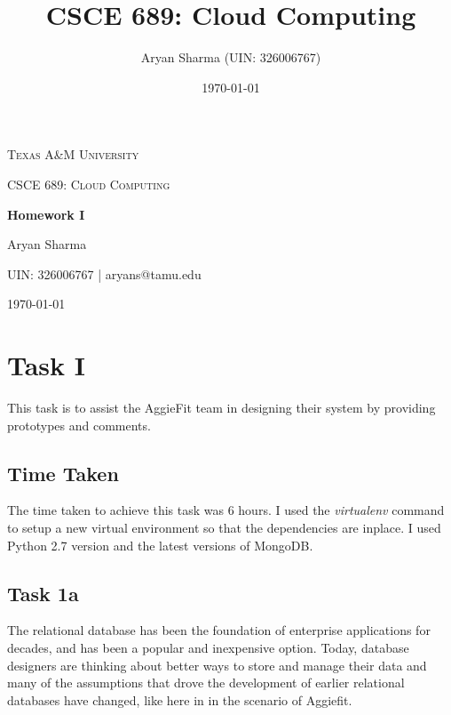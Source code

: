 \documentclass[letterpaper]{article}
\title{CSCE 689: Cloud Computing}
\author{Aryan Sharma (UIN: 326006767)}
\date{\today}
\newcommand\blankpage{%
	\null
	\thispagestyle{empty}%
	\addtocounter{page}{-1}%
	\newpage}
\begin{document}

\begin{titlepage}
	\centering
	{\scshape\LARGE Texas A\&M University \par}
	\vspace{1cm}
	{\scshape\Large CSCE 689: Cloud Computing\par}
	\vspace{1.5cm}
	{\huge\bfseries Homework I\par}
	\vspace{2cm}
	{\Large Aryan Sharma \par}
	{\normalsize UIN: 326006767 | aryans@tamu.edu\par}
	\vfill
	
	{\large \today\par}
\end{titlepage}

\tableofcontents

\newpage

\section{Task I}
\label{sec:introduction}

This task is to assist the AggieFit team in designing their system by providing prototypes and comments.

\subsection{Time Taken}

The time taken to achieve this task was 6 hours. I used the \textit{virtualenv} command to setup a new virtual environment so that the dependencies are inplace. I used Python 2.7 version and the latest versions of MongoDB. 

\subsection{Task 1a}

The relational database has been the foundation of enterprise applications for decades, and has been a popular and inexpensive option. Today, database designers are thinking about better ways to store and manage their data and many of the assumptions that drove the development of earlier relational databases have changed, like here in in the scenario of Aggiefit.
\end{document}
